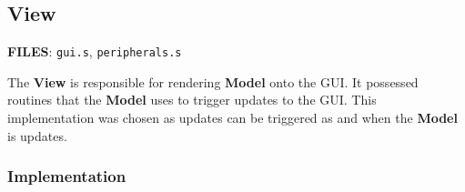   \subsection{View}

  \quad\textbf{FILES}: \texttt{gui.s}, \texttt{peripherals.s}


  The \textbf{View} is responsible for rendering \textbf{Model} onto the GUI. It possessed routines that
  the \textbf{Model} uses to trigger updates to the GUI. This implementation was chosen as updates can
  be triggered as and when the \textbf{Model} is updates.

    \subsubsection{Implementation}



